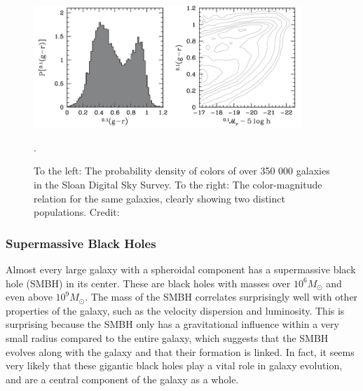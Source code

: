 \begin{figure}
    \centering
    \includegraphics[width=0.9\textwidth]{images/color_bimodality.png}
    \caption{To the left: The probability density of colors of over 350 000 galaxies in the Sloan Digital Sky Survey. To the right: The color-magnitude relation for the same galaxies, clearly showing two distinct populations. Credit: \cite{Mo2010}}.
    \label{color_bimodality}
\end{figure}

\subsubsection{Supermassive Black Holes}
Almost every large galaxy with a spheroidal component has a supermassive black hole (SMBH) in its center. These are black holes with masses over $10^6 M_{\odot}$ and even above $10^9 M_{\odot}$. The mass of the SMBH correlates surprisingly well with other properties of the galaxy, such as the velocity dispersion and luminosity. This is surprising because the SMBH only has a gravitational influence within a very small radius compared to the entire galaxy, which suggests that the SMBH evolves along with the galaxy and that their formation is linked. In fact, it seems very likely that these gigantic black holes play a vital role in galaxy evolution, and are a central component of the galaxy as a whole.